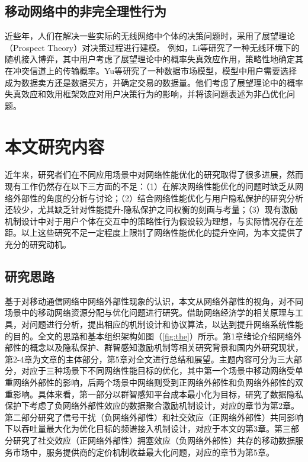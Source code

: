 \subsection{移动网络中的非完全理性行为}
近些年，人们在解决一些实际的无线网络中个体的决策问题时，采用了展望理论（Prospect Theory）\cite{Kahneman}对决策过程进行建模。 例如，Li等\cite{Tianming}研究了一种无线环境下的随机接入博弈，其中用户考虑了展望理论中的{\kaishu 概率失真效应}作用，策略性地确定其在冲突信道上的传输概率。Yu等\cite{Yu}研究了一种数据市场模型，模型中用户需要选择成为数据卖方还是数据买方，并确定交易的数据量。他们考虑了展望理论中的{\kaishu 概率失真效应}和{\kaishu 效用框架效应}对用户决策行为的影响，并将该问题表述为非凸优化问题。

\section{本文研究内容}

近年来，研究者们在不同应用场景中对网络性能优化的研究取得了很多进展，然而现有工作仍然存在以下三方面的不足：（1）在解决网络性能优化的问题时缺乏从网络外部性的角度的分析与讨论；（2）结合网络性能优化与用户隐私保护的研究分析还较少，尤其缺乏针对性能提升-隐私保护之间权衡的刻画与考量；（3）现有激励机制设计中对于用户个体在交互中的策略性行为假设较为理想，与实际情况存在差距。以上这些研究不足一定程度上限制了网络性能优化的提升空间，为本文提供了充分的研究动机。

\subsection{研究思路}

基于对移动通信网络中网络外部性现象的认识，本文从网络外部性的视角，对不同场景中的移动网络资源分配与优化问题进行研究。借助网络经济学的相关原理与工具，对问题进行分析，提出相应的机制设计和协议算法，以达到提升网络系统性能的目的。全文的思路和基本组织架构如图（\ref{fig:the}）所示。第1章绪论介绍网络外部性的概念以及隐私保护、群智感知激励机制等相关研究背景和国内外研究现状，第2-4章为文章的主体部分，第5章对全文进行总结和展望。主题内容可分为三大部分，对应于三种场景下不同网络性能目标的优化，其中第一个场景中移动网络受单重网络外部性的影响，后两个场景中网络则受到正网络外部性和负网络外部性的双重影响。具体来看，第一部分以群智感知平台成本最小化为目标，研究了数据隐私保护下考虑了{\kaishu 负网络外部性}效应的数据聚合激励机制设计，对应的章节为第2章。第二部分研究了信号干扰（{\kaishu 负网络外部性}）和社交效应（{\kaishu 正网络外部性}）共同影响下以吞吐量最大化为优化目标的频谱接入机制设计，对应于本文的第3章。第三部分研究了社交效应（{\kaishu 正网络外部性}）拥塞效应（{\kaishu 负网络外部性}）共存的移动数据服务市场中，服务提供商的定价机制收益最大化问题，对应的章节为第5章。

